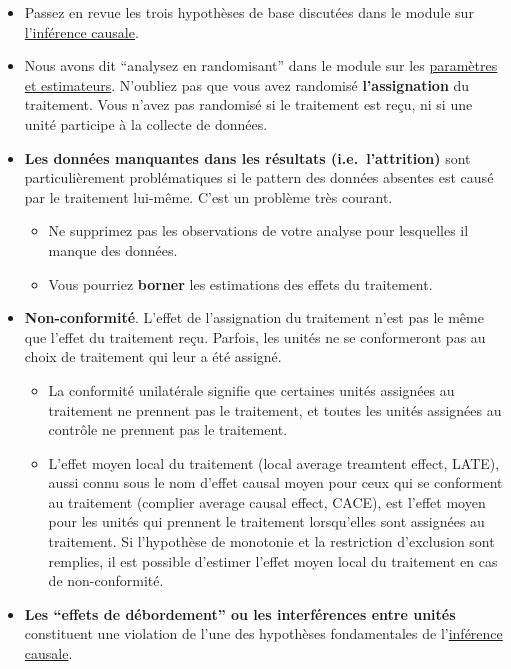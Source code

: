\documentclass[12pt,]{book}
\begin{document}
\begin{itemize}
\item
  Passez en revue les trois hypothèses de base discutées dans le module sur \href{inférence-causale.html}{l'inférence causale}.
\item
  Nous avons dit ``analysez en randomisant'' dans le module sur les \href{paramètres-et-estimateurs.html}{paramètres et estimateurs}. N'oubliez pas que vous avez randomisé \textbf{l'assignation} du traitement. Vous n'avez pas randomisé si le traitement est reçu, ni si une unité participe à la collecte de données.
\item
  \textbf{Les données manquantes dans les résultats (i.e.~l'attrition)} sont particulièrement problématiques si le pattern des données absentes est causé par le traitement lui-même. C'est un problème très courant.

  \begin{itemize}
  \item
    Ne supprimez pas les observations de votre analyse pour lesquelles il manque des données.
  \item
    Vous pourriez \textbf{borner} les estimations des effets du traitement.
  \end{itemize}
\item
  \textbf{Non-conformité}. L'effet de l'assignation du traitement n'est pas le même que l'effet du traitement reçu. Parfois, les unités ne se conformeront pas au choix de traitement qui leur a été assigné.

  \begin{itemize}
  \item
    La conformité unilatérale signifie que certaines unités assignées au traitement ne prennent pas le traitement, et toutes les unités assignées au contrôle ne prennent pas le traitement.
  \item
    L'effet moyen local du traitement (local average treamtent effect, LATE), aussi connu sous le nom d'effet causal moyen pour ceux qui se conforment au traitement (complier average causal effect, CACE), est l'effet moyen pour les unités qui prennent le traitement lorsqu'elles sont assignées au traitement. Si l'hypothèse de monotonie et la restriction d'exclusion sont remplies, il est possible d'estimer l'effet moyen local du traitement en cas de non-conformité.
  \end{itemize}
\item
  \textbf{Les ``effets de débordement'' ou les interférences entre unités} constituent une violation de l'une des hypothèses fondamentales de l'\href{inférence-causale.html}{inférence causale}.


\end{itemize}
\end{document}
